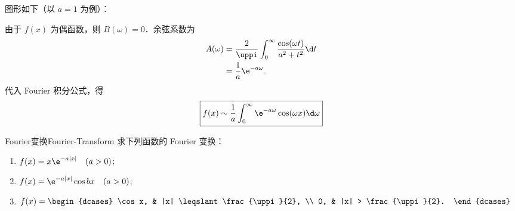 \begin{solution}
    图形如下（以 $a=1$ 为例）：
    \begin{center}
    \end{center}

    由于 $f(x)$ 为偶函数，则 $B(\omega) = 0$．余弦系数为
    \begin{equation}\label{eq:p1s3-A}
        \begin{aligned}
            A(\omega) & = \frac{2}{\uppi} \int_0^{\infty} \frac{\cos(\omega t)}{a^2+t^2} \d t \\
                      & = \frac{1}{a} \e^{-a\omega}.
        \end{aligned}
    \end{equation}
    代入 Fourier 积分公式，得
    \begin{equation}
        \boxed{f(x) \sim \frac{1}{a} \int_0^\infty \e^{-a\omega} \cos(\omega x) \d\omega}
    \end{equation}
\end{solution}

\begin{problem}{Fourier变换}{Fourier-Transform}
    求下列函数的 Fourier 变换：
    \begin{enumerate}
        \item $f(x) = x\e^{-a|x|} \quad (a > 0)$;
        \item $f(x) = \e^{-a|x|} \cos bx \quad (a > 0)$;
        \item $f(x) = \begin{dcases} \cos x, & |x| \leqslant \frac{\uppi}{2}, \\ 0, & |x| > \frac{\uppi}{2}. \end{dcases}$
    \end{enumerate}
\end{problem}

